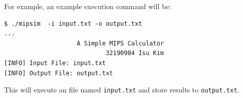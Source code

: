 \documentclass{homework}
\begin{document}
For example, an example execution command will be:
\\
\begin{center}
\begin{code}
\begin{verbatim}
$ ./mipsim  -i input.txt -o output.txt
...
                    A Simple MIPS Calculator
                            32190984 Isu Kim
[INFO] Input File: input.txt
[INFO] Output File: output.txt
\end{verbatim}
\end{code}
\end{center}

This will execute an file named \texttt{input.txt} and store results to \texttt{output.txt}. 


\pagebreak
\end{document}
